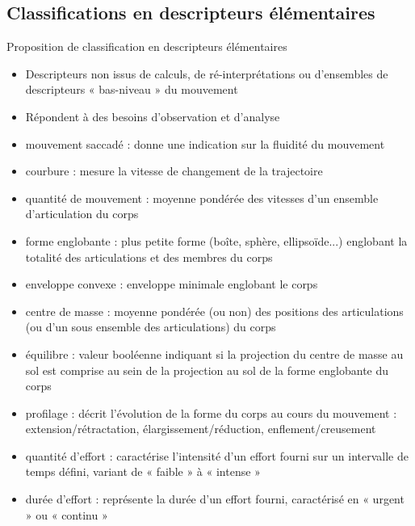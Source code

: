 \documentclass[svgnames]{beamer}
\begin{document}
	\subsection{Classifications en descripteurs élémentaires}
	\begin{frame}{\subsecname}
	Proposition de classification en descripteurs élémentaires
		\begin{itemize}[label=$\bullet$]
			\item Descripteurs non issus de calculs, de ré-interprétations ou d'ensembles de descripteurs « bas-niveau » du mouvement
			\item Répondent à des besoins d'observation et d'analyse
		\end{itemize}
	\end{frame}
	
	\begin{frame}{\subsecname}
		\begin{itemize}[label=$\bullet$]
			\item mouvement saccadé : donne une indication sur la fluidité du mouvement
			\item courbure : mesure la vitesse de changement de la trajectoire
			\item quantité de mouvement : moyenne pondérée des vitesses d'un ensemble d'articulation du corps
			\item forme englobante : plus petite forme (boîte, sphère, ellipsoïde...) englobant la totalité des articulations et des membres du corps
			\item enveloppe convexe : enveloppe minimale englobant le corps
			\item centre de masse : moyenne pondérée (ou non) des positions des articulations (ou d'un sous ensemble des articulations) du corps
		\end{itemize}
	\end{frame}
	
	\begin{frame}{\subsecname}
		\begin{itemize}[label=$\bullet$]
			\item équilibre : valeur booléenne indiquant si la projection du centre de masse au sol est comprise au sein de la projection au sol de la forme englobante du corps
			\item profilage : décrit l'évolution de la forme du corps au cours du mouvement : extension/rétractation, élargissement/réduction, enflement/creusement
			\item quantité d'effort : caractérise l'intensité d'un effort fourni sur un intervalle de temps défini, variant de « faible » à « intense »
			\item durée d'effort : représente la durée d'un effort fourni, caractérisé en « urgent » ou « continu »
		\end{itemize}
	\end{frame}
	
\end{document}

